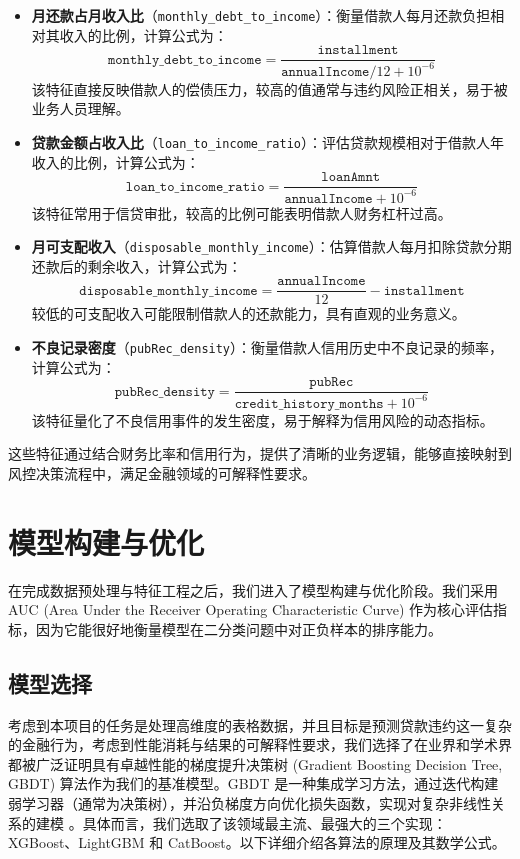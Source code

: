 \documentclass{thuemp}
\begin{document}
\begin{itemize}
    \item \textbf{月还款占月收入比}（\texttt{monthly\_debt\_to\_income}）：衡量借款人每月还款负担相对其收入的比例，计算公式为：
    \[
    \texttt{monthly\_debt\_to\_income} = \frac{\texttt{installment}}{\texttt{annualIncome} / 12 + 10^{-6}}
    \]
    该特征直接反映借款人的偿债压力，较高的值通常与违约风险正相关，易于被业务人员理解。
    \item \textbf{贷款金额占收入比}（\texttt{loan\_to\_income\_ratio}）：评估贷款规模相对于借款人年收入的比例，计算公式为：
    \[
    \texttt{loan\_to\_income\_ratio} = \frac{\texttt{loanAmnt}}{\texttt{annualIncome} + 10^{-6}}
    \]
    该特征常用于信贷审批，较高的比例可能表明借款人财务杠杆过高。
    \item \textbf{月可支配收入}（\texttt{disposable\_monthly\_income}）：估算借款人每月扣除贷款分期还款后的剩余收入，计算公式为：
    \[
    \texttt{disposable\_monthly\_income} = \frac{\texttt{annualIncome}}{12} - \texttt{installment}
    \]
    较低的可支配收入可能限制借款人的还款能力，具有直观的业务意义。
    \item \textbf{不良记录密度}（\texttt{pubRec\_density}）：衡量借款人信用历史中不良记录的频率，计算公式为：
    \[
    \texttt{pubRec\_density} = \frac{\texttt{pubRec}}{\texttt{credit\_history\_months} + 10^{-6}}
    \]
    该特征量化了不良信用事件的发生密度，易于解释为信用风险的动态指标。
\end{itemize}

这些特征通过结合财务比率和信用行为，提供了清晰的业务逻辑，能够直接映射到风控决策流程中，满足金融领域的可解释性要求。

\section{模型构建与优化}
\label{sec:model_building}

在完成数据预处理与特征工程之后，我们进入了模型构建与优化阶段。我们采用 AUC (Area Under the Receiver Operating Characteristic Curve) 作为核心评估指标，因为它能很好地衡量模型在二分类问题中对正负样本的排序能力。

\subsection{模型选择}

考虑到本项目的任务是处理高维度的表格数据，并且目标是预测贷款违约这一复杂的金融行为，考虑到性能消耗与结果的可解释性要求，我们选择了在业界和学术界都被广泛证明具有卓越性能的梯度提升决策树 (Gradient Boosting Decision Tree, GBDT) 算法作为我们的基准模型。GBDT 是一种集成学习方法，通过迭代构建弱学习器（通常为决策树），并沿负梯度方向优化损失函数，实现对复杂非线性关系的建模 \citep{friedman2001greedy}。具体而言，我们选取了该领域最主流、最强大的三个实现：XGBoost、LightGBM 和 CatBoost。以下详细介绍各算法的原理及其数学公式。
\end{document}
